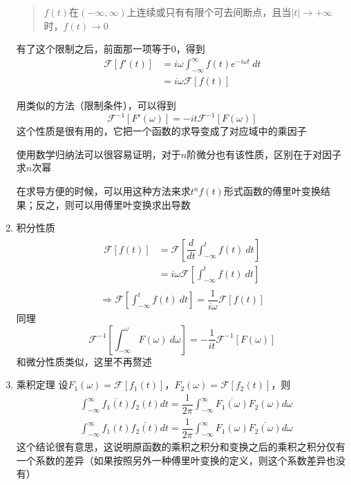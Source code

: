 \documentclass[UTF8]{ctexbook}
\begin{document}
\begin{enumerate}
					\begin{quote}
						$f(t)$在$(-\infty, \infty)$上连续或只有有限个可去间断点，且当$|t|\to +\infty$时，$f(t)\to 0$
					\end{quote}
		
					有了这个限制之后，前面那一项等于0，得到
					\begin{equation}
						\begin{split}
						\mathscr{F}[f'(t)]&=i\omega\int_{-\infty}^{\infty}f(t)e^{-i\omega t}\ dt\\
						&=i\omega\mathscr{F}[f(t)]
						\end{split}
					\end{equation}
		
					用类似的方法（限制条件），可以得到
					\begin{equation}
						\mathscr{F}^{-1}[F'(\omega)]=-it\mathscr{F}^{-1}[F(\omega)]
					\end{equation}
					这个性质是很有用的，它把一个函数的求导变成了对应域中的乘因子
		
					使用数学归纳法可以很容易证明，对于$n$阶微分也有该性质，区别在于对因子求$n$次幂
		
					在求导方便的时候，可以用这种方法来求$t^nf(t)$形式函数的傅里叶变换结果；反之，则可以用傅里叶变换求出导数

				\item{积分性质}
					\begin{equation}
						\begin{split}
							\begin{split}
							\mathscr{F}[f(t)]&=\mathscr{F}[\dfrac{d}{dt}\int_{-\infty}^tf(t)\ dt]\\
							&= i\omega\mathscr{F}[\int_{-\infty}^tf(t)\ dt]
							\end{split}\\
							\Rightarrow\mathscr{F}[\int_{-\infty}^tf(t)\ dt]=\dfrac{1}{i\omega}\mathscr{F}[f(t)]
						\end{split}
					\end{equation}
					同理
					\begin{equation}
						\mathscr{F}^{-1}[\int_{-\infty}^\omega F(\omega)\ d\omega]=-\dfrac{1}{it}\mathscr{F}^{-1}[F(\omega)]
					\end{equation}
					和微分性质类似，这里不再赘述

				\item{乘积定理}
					设$F_1(\omega) = \mathscr{F}[f_1(t)]$，$F_2(\omega) = \mathscr{F}[f_2(t)]$，则
					\begin{equation}
						\begin{split}
							&\int_{-\infty}^{\infty}\overline{f_1(t)}f_2(t)dt=\dfrac{1}{2\pi}\int_{-\infty}^{\infty}\overline{F_1(\omega)}F_2(\omega)d\omega\\
							&\int_{-\infty}^{\infty}f_1(t)\overline{f_2(t)}dt=\dfrac{1}{2\pi}\int_{-\infty}^{\infty}F_1(\omega)\overline{F_2(\omega)}d\omega
						\end{split}
					\end{equation}
					这个结论很有意思，这说明原函数的乘积之积分和变换之后的乘积之积分仅有一个系数的差异（如果按照另外一种傅里叶变换的定义，则这个系数差异也没有）


\end{enumerate}
\end{document}
